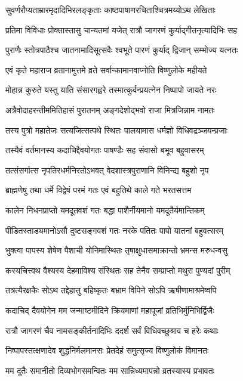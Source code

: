 \twolineshloka
{सुवर्णरौप्यताम्रारमृदादिभिरलङ्कृताः}
{काष्ठपाषाणरचिताश्चित्रमय्योऽथ लेखिताः}%

\twolineshloka
{प्रतिमा विविधाः प्रोक्तास्तासु चान्यतमां यजेत्}
{रात्रौ जागरणं कुर्याद्गीतनृत्यादिभिः सह}%

\twolineshloka
{पुराणैः स्तोत्रपाठैश्च जातनामादिसूत्सवैः}
{श्वभूते पारणं कुर्याद् द्विजान् सम्भोज्य यत्नतः}%

\twolineshloka
{एवं कृते महाराज व्रतानामुत्तमे व्रते}
{सर्वान्कामानवाप्नोति विष्णुलोके महीयते}%

\twolineshloka
{मोहान्न कुरुते यस्तु याति संसारगह्वरे}
{तस्मात्कुर्वन्प्रयत्नेन निष्पापो जायते नरः}%

\twolineshloka
{अत्रैवोदाहरन्तीममितिहासं पुरातनम्}
{अङ्गदेशोद्भवो राजा मित्रजिन्नाम नामतः}%

\twolineshloka
{तस्य पुत्रो महातेजः सत्यजित्सत्पथे स्थितः}
{पालयामास धर्मज्ञो विधिवद्रञ्जयन्प्रजाः}%

\twolineshloka
{तस्यैवं वर्तमानस्य कदाचिद्दैवयोगतः}
{पाषण्डैः सह संवासो बभूव बहुवासरम्}%

\twolineshloka
{तत्संसर्गात्स नृपतिरधर्मनिरतोऽभवत्}
{वेदशास्त्रपुराणानि विनिन्द्य बहुशो नृप}%

\twolineshloka
{ब्राह्मणेषु तथा धर्मे विद्वेषं परमं गतः}
{एवं बहुतिथे काले गते भरतसत्तम}%

\twolineshloka
{कालेन निधनप्राप्तो यमदूतवशं गतः}
{बद्धा पाशैर्नीयमानो यमदूतैर्यमान्तिकम्}%

\twolineshloka
{पीडितस्ताड्यमानोऽसौ दुष्टसङ्गवशं गतः}
{नरके पतितः पापो यातनां बहुवत्सरम्}%

\twolineshloka
{भुक्त्वा पापस्य शेषेण पैशाची योनिमास्थितः}
{तृषाक्षुधासमाक्रान्तो भ्रमन्स मरुधन्वसु}%

\twolineshloka
{कस्यचित्त्वथ वैश्यस्य देहमाविश्य संस्थितः}
{सह तेनैव सम्प्राप्तो मथुरा पुण्यदां पुरीम्}%

\twolineshloka
{तत्रत्यैरक्षकैः सोऽथ तद्देहात्तु बहिष्कृतः}
{बभ्राम विपिने सोऽपि ऋषीणामाश्रमेष्वपि}%

\twolineshloka
{कदाचिद् दैवयोगेन मम जन्माष्टमीदिने}
{क्रियमाणां महापूजां व्रतिभिर्मुनिभिर्द्विजैः}%

\twolineshloka
{रात्रौ जागरणं चैव नामसङ्कीर्तनादिभिः}
{ददर्श सर्वं विधिवच्छुश्राव च हरेः कथाः}%

\twolineshloka
{निष्पापस्तत्क्षणादेव शुद्धनिर्मलमानसः}
{प्रेतदेहं समुत्सृज्य विष्णुलोकं विमानतः}%

\twolineshloka
{मम दूतैः समानीतो दिव्यभोगसमन्वितः}
{मम सान्निध्यमापन्नो व्रतस्यास्य प्रभावतः}%

